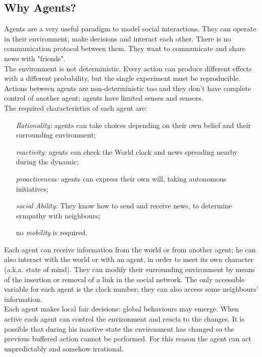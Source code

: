 \subsection{Why Agents?}
Agents are a very useful paradigm to model social interactions. 
They can operate in their environment, make decisions and interact each other.
There is no communication protocol between them. They want to communicate and share news with "friends". \\
The environment is not deterministic. 
Every action can produce different effects with a different probability, but the single experiment must be reproducible.
Actions between agents are non-deterministic too and they don't have complete control of another
agent; agents have limited senses and sensors.
\\
The required characteristics of each agent are: \begin{itemize}
\item [\textit {Rationality:}] agents can take choices depending on their own belief and their surrounding environment;
\item [\textit {reactivity:}] agents can check the World clock and news spreading nearby during the dynamic;
\item [\textit {proactiveness:}] agents can express their own will, taking autonomous initiatives;
\item [\textit {social Ability:}] They know how to send and receive news, to determine sympathy with neighbours;
\item [no \textit{mobility}] is required. 
\end{itemize}

Each agent can receive information from the world or from another agent; he can also interact with 
the world or with an agent, in order to meet its own character (a.k.a. state of mind).
They can modify their surrounding environment by means of the insertion or removal of a link in the social network.
The only accessible variable for each agent is the clock number; they can also access some neighbours' information.
\\
Each agent makes local fair decisions: global behaviours may emerge.
When active each agent can control the environment and reacts to the changes. 
It is possible that during his inactive state the environment has changed so the previous buffered action cannot be performed.
For this reason the agent can act unpredictably and somehow irrational.
